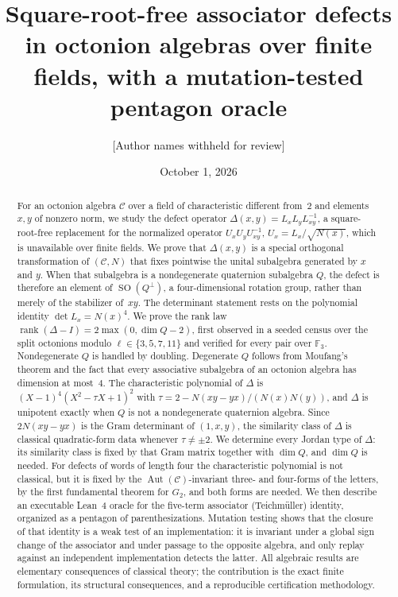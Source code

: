 \documentclass[11pt]{amsart}
\title[Square-root-free associator defects]{Square-root-free associator defects in octonion algebras over finite fields, with a mutation-tested pentagon oracle}
\author{[Author names withheld for review]}
\date{October 1, 2026}
\theoremstyle{definition}
\theoremstyle{remark}
\newcommand{\F}{\mathbb{F}}
\newcommand{\C}{\mathcal{C}}
\DeclareMathOperator{\rank}{rank}
\DeclareMathOperator{\SO}{SO}
\begin{document}
\begin{abstract}
For an octonion algebra $\C$ over a field of characteristic different from~$2$
and elements $x,y$ of nonzero norm, we study the defect operator
$\Delta(x,y)=L_xL_yL_{xy}^{-1}$, a square-root-free replacement for the
normalized operator $U_xU_yU_{xy}^{-1}$, $U_x=L_x/\sqrt{N(x)}$, which is
unavailable over finite fields. We prove that $\Delta(x,y)$ is a
special orthogonal transformation of $(\C,N)$ that fixes pointwise the unital
subalgebra generated by $x$ and $y$. When that subalgebra is a nondegenerate
quaternion subalgebra $Q$, the defect is therefore an element of
$\SO(Q^\perp)$, a four-dimensional rotation group, rather than merely of the
stabilizer of~$xy$. The determinant statement rests on the polynomial identity
$\det L_x=N(x)^4$. We prove the rank law
$\rank(\Delta-I)=2\max(0,\dim Q-2)$, first observed in a seeded census over
the split octonions modulo $\ell\in\{3,5,7,11\}$ and verified for every
pair over $\F_3$. Nondegenerate $Q$ is handled by doubling. Degenerate $Q$
follows from Moufang's theorem and the fact that every associative subalgebra
of an octonion algebra has dimension at most~$4$. The characteristic
polynomial of $\Delta$ is $(X-1)^4(X^2-\tau X+1)^2$ with
$\tau=2-N(xy-yx)/(N(x)N(y))$, and $\Delta$ is unipotent exactly when $Q$ is not a
nondegenerate quaternion algebra. Since $2N(xy-yx)$ is the Gram determinant of
$(1,x,y)$, the similarity class of $\Delta$ is classical quadratic-form data
whenever $\tau\neq\pm2$. We determine every Jordan type of $\Delta$: its
similarity class is fixed by that Gram matrix together with $\dim Q$, and
$\dim Q$ is needed. For defects of words of length four the characteristic
polynomial is not classical, but it is fixed by the
$\operatorname{Aut}(\C)$-invariant three- and four-forms of the letters, by the
first fundamental theorem for $G_2$, and both forms are needed. We then describe an
executable Lean~4 oracle for the five-term associator (Teichm\"uller) identity,
organized as a pentagon of parenthesizations. Mutation testing shows that the
closure of that identity is a weak test of an implementation: it is invariant
under a global sign change of the associator and under passage to the opposite
algebra, and only replay against an independent implementation detects the
latter. All algebraic results are elementary consequences of classical theory;
the contribution is the exact finite formulation, its structural consequences,
and a reproducible certification methodology.
\end{abstract}
\end{document}
